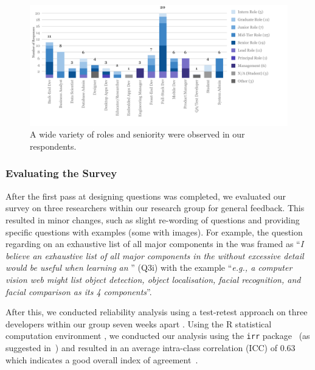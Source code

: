 \begin{figure}[t]
\centering
\includegraphics[width=\linewidth]{roles-and-seniority.pdf}
\caption[Roles and seniority from survey participants]{A wide variety of roles and seniority were observed in our respondents.}
\label{tse2020:fig:roles-and-seniority}
\end{figure}

\subsubsection{Evaluating the Survey}
\label{tse2020:sec:validation:survey:eval}

After the first pass at designing questions was completed, we evaluated our survey on three researchers within our research group for general feedback. This resulted in minor changes, such as slight re-wording of questions and providing specific questions with examples (some with images). For example, the question regarding  on an exhaustive list of all major components in the  was framed as ``\textit{I believe an exhaustive list of all major components in the  without excessive detail would be useful when learning an }'' (Q3i) with the example ``\textit{e.g., a computer vision web  might list object detection, object localisation, facial recognition, and facial comparison as its 4 components}''.

After this, we conducted reliability analysis using a test-retest approach on three developers within our group seven weeks apart \citep{Hallgren:2012kt}. Using the R statistical computation environment \citep{RCoreTeam}, we conducted our analysis using the \texttt{irr} package~\citep{Gamer:tj} (as suggested in~\citep{Hallgren:2012kt}) and  resulted in an average intra-class correlation (ICC) of 0.63 which indicates a good overall index of agreement~\citep{cicchetti1994guidelines}.

